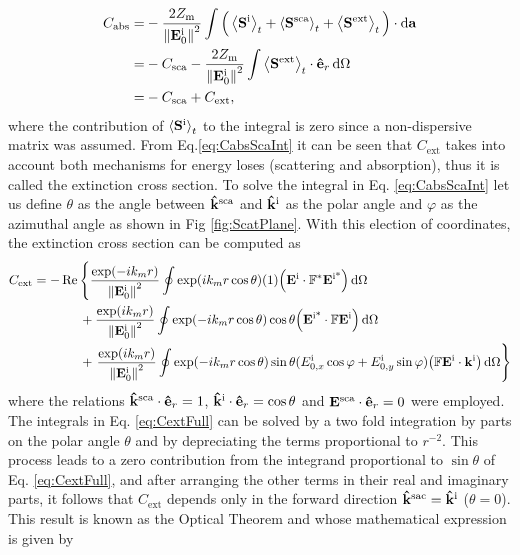 %
\begin{align}
C_\text{abs} = & - \frac{2Z_\text{m}}{\norm{\vb{E}^\text{i}_0}^2}\int\Big(\ev{\vb{S}^\text{i}}_t + \ev{\vb{S}^\text{sca}}_t + \ev{\vb{S}^\text{ext}}_t\Big)\cdot\dd{\vb{a}}
					\notag \\
			=  & - C_\text{sca} - \frac{2Z_\text{m}}{\norm{\vb{E}_0^\text{i}}^2}\int   \ev{\vb{S}^\text{ext}}_t\cdot \vu{e}_r\dd{\Omega}
					\notag \\
			= & -C_\text{sca} + C_\text{ext},
\label{eq:CabsScaInt}
\end{align}
%
where the contribution of $\ev{\vb{S}^\text{i}}_t$ to the integral is zero since a non-dispersive matrix was assumed. From Eq.\eqref{eq:CabsScaInt} it can be seen that $C_\text{ext}$ takes into account both mechanisms for energy loses (scattering and absorption), thus it is called the extinction cross section. To solve the integral in Eq. \eqref{eq:CabsScaInt} let us define $\theta$ as the angle between $\vu{k}^\text{sca}$ and $\vu{k}^\text{i}$ as the polar angle  and  $\varphi$ as the azimuthal angle as shown in Fig \ref{fig:ScatPlane}. With this election of coordinates,  the extinction cross section can be computed as
%
\begin{align}
C_\text{ext} = - &\Re \left\{
			 \frac{\exp(-ik_mr) }{\norm{\vb{E}_0^\text{i}}^2}
			 					\oint \exp(ik_mr\cos\theta)(1)\qty(\vb{E}^\text{i}\cdot \mathbb{F}^*\vb{E}^\text{i*})  \dd{\Omega} \right.	\notag\\
			&\hspace*{1.5em}+\frac{\exp(ik_mr) }{\norm{\vb{E}_0^\text{i}}^2}
								\oint \exp(-ik_mr\cos\theta)\cos\theta \qty(\vb{E}^\text{i*}\cdot \mathbb{F}\vb{E}^\text{i})     \dd{\Omega}
\label{eq:CextFull}\\
			&\hspace*{1.5em}+\left.\frac{\exp(ik_mr) }{\norm{\vb{E}^\text{i}_0}^2}
								\oint \exp(-ik_mr\cos\theta)\sin\theta(E_{0,x}^\text{i}\cos\varphi+E_{0,y}^\text{i}\sin\varphi)
									\qty(\mathbb{F}\vb{E}^\text{i}\cdot\vb{k}^\text{i})    \dd{\Omega}  \right\} \notag
\end{align}
%
where the relations $\vu{k}^\text{sca}\cdot\vu{e}_r = 1$, $\vu{k}^\text{i}\cdot\vu{e}_r = \cos\theta$ and  $\vb{E}^\text{sca}\cdot\vu{e}_r = 0$ were employed. The integrals in Eq. \eqref{eq:CextFull} can be solved by a two fold integration by parts on the polar angle $\theta$ and by depreciating the terms proportional to $r^{-2}$. This process leads to a zero contribution from the integrand proportional to $\sin\theta$  of Eq. \eqref{eq:CextFull}, and after arranging the other terms in their real and imaginary parts, it follows that $C_\text{ext}$ depends only in the forward direction  $\vu{k}^\text{sac} = \vu{k}^\text{i}$ ($\theta =0$). This result is known as the Optical Theorem and whose mathematical expression is given by \cite{tsang_scattering_2000,pellarin_forward_2019,newton_optical_1976}
